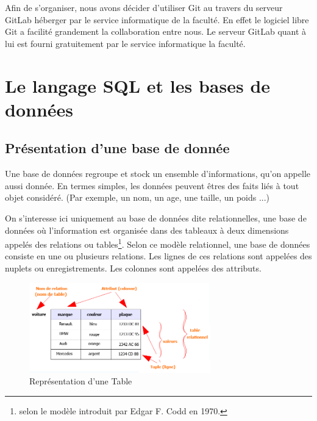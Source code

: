 \documentclass[oneside,13pt,a4paper]{report}
\begin{document}
            Afin de s’organiser, nous avons décider d’utiliser Git au travers du serveur GitLab héberger par le service informatique de la faculté. En effet le logiciel libre Git a facilité grandement la collaboration entre nous. Le serveur GitLab quant à lui est fourni gratuitement par le service informatique la faculté.


    \chapter{Le langage SQL et les bases de données}


        \section{Présentation d’une base de donnée}

            Une base de données regroupe et stock un ensemble d’informations, qu'on appelle aussi donnée.
            En termes simples, les données peuvent êtres des faits liés à tout objet considéré.
            (Par exemple, un nom, un age, une taille, un poids ...)

            On s'interesse ici uniquement au base de données dite relationnelles, une base de données où l'information est organisée dans des tableaux à deux dimensions appelés des relations ou tables\footnote{ selon le modèle introduit par Edgar F. Codd en 1970.}.
            Selon ce modèle relationnel, une base de données consiste en une ou plusieurs relations. Les lignes de ces relations sont appelées des nuplets ou enregistrements. Les colonnes sont appelées des attributs.

            \begin{figure}[h]
                \centering
                \includegraphics[width=0.7\textwidth]{img/table_relationnel.png}
                \caption{Représentation d'une Table}
            \end{figure}
            
\end{document}
